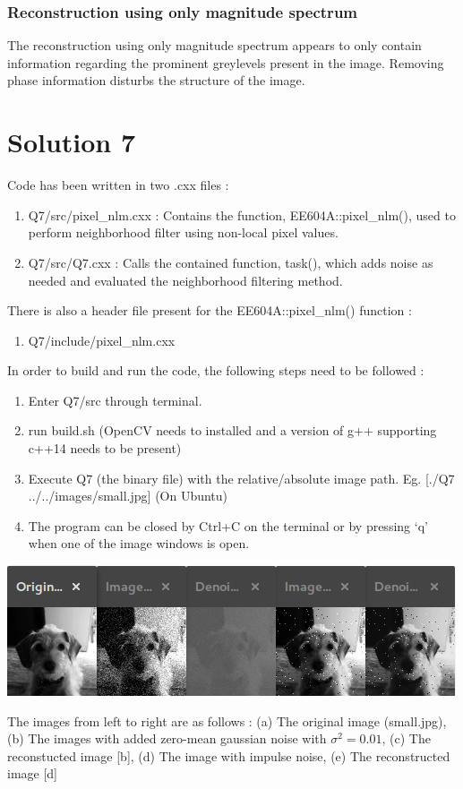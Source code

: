 \documentclass[a4paper,fleqn,11pt]{article}
\theoremstyle{mytheor}
\begin{document}
\subsubsection*{Reconstruction using only magnitude spectrum}
The reconstruction using only magnitude spectrum appears to only contain information regarding the prominent greylevels present in the image. Removing phase information disturbs the structure of the image.

\section*{Solution 7}
Code has been written in two .cxx files :
\begin{enumerate}
\item Q7/src/pixel\_nlm.cxx : Contains the function, EE604A::pixel\_nlm(), used to perform neighborhood filter using non-local pixel values.
\item Q7/src/Q7.cxx : Calls the contained function, task(), which adds noise as needed and evaluated the neighborhood filtering method.
\end{enumerate}

There is also a header file present for the EE604A::pixel\_nlm() function :
\begin{enumerate}
\item Q7/include/pixel\_nlm.cxx
\end{enumerate}

In order to build and run the code, the following steps need to be followed :
\begin{enumerate}
\item Enter Q7/src through terminal.
\item run build.sh (OpenCV needs to installed and a version of g++ supporting c++14 needs to be present)
\item Execute Q7 (the binary file) with the relative/absolute image path. Eg. [./Q7 ../../images/small.jpg] (On Ubuntu)
\item The program can be closed by Ctrl+C on the terminal or by pressing `q' when one of the image windows is open.
\end{enumerate}

\pagebreak

\begin{center}
\includegraphics[scale=1.0]{../results/Q7.png}
\end{center}
The images from left to right are as follows : (a) The original image (small.jpg), (b) The images with added zero-mean gaussian noise with $\sigma^2 = 0.01$, (c) The reconstucted image [b], (d) The image with impulse noise, (e) The reconstructed image [d]
\end{document}
